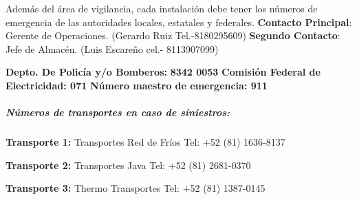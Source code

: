 Además del área de vigilancia, cada instalación debe tener los números de emergencia de las autoridades locales, estatales y federales.
\textbf{Contacto Principal}: Gerente de Operaciones. (Gerardo Ruiz Tel.-8180295609)
\textbf{Segundo Contacto}: Jefe de Almacén. (Luis Escareño cel.- 8113907099)

\textbf{Depto. De Policía y/o Bomberos:} \textbf{8342 0053}
\textbf{Comisión Federal de Electricidad: 071}
\textbf{Número maestro de emergencia: 911}

\subparagraph{Números de transportes en caso de siniestros:}

\textbf{Transporte 1:} Transportes Red de Fríos
Tel: +52 (81) 1636-8137

\textbf{Transporte 2:} Transportes Java
Tel: +52 (81) 2681-0370

\textbf{Transporte 3:} Thermo Transportes
Tel: +52 (81) 1387-0145
